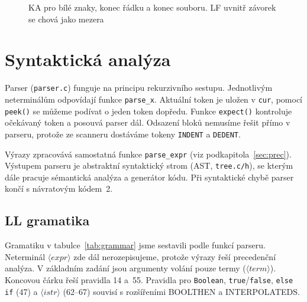 \documentclass[a4paper,11pt]{article}
\newcommand{\id}[1]{\texttt{#1}}
\newcommand{\nt}[1]{\ensuremath{\langle\mathit{#1}\rangle}}
\newcommand{\term}[1]{\texttt{#1}}
\begin{document}
\begin{figure}[H]
  \centering
  \caption{KA pro bílé znaky, konec řádku a konec souboru. LF uvnitř závorek se chová jako mezera}
  \label{fig:ka-ws}
\end{figure}


\section{Syntaktická analýza}
Parser (\id{parser.c}) funguje na principu rekurzivního sestupu. Jednotlivým neterminálům odpovídají funkce \id{parse\_x}. Aktuální token je uložen v \id{cur}, pomocí \id{peek()} se můžeme podívat o jeden token dopředu. Funkce \id{expect()} kontroluje očekávaný token a posouvá parser dál. Odsazení bloků nemusíme řešit přímo v parseru, protože ze scanneru dostáváme tokeny \term{INDENT} a \term{DEDENT}.

Výrazy zpracovává samostatná funkce \id{parse\_expr} (viz podkapitola~\ref{sec:prec}). Výstupem parseru je abstraktní syntaktický strom (AST, \id{tree.c/h}), se kterým dále pracuje sémantická analýza a generátor kódu. Při syntaktické chybě parser končí s návratovým kódem~2.

\subsection{LL gramatika}
Gramatiku v tabulce~\ref{tab:grammar} jsme sestavili podle funkcí parseru. Neterminál \nt{expr} zde dál nerozepisujeme, protože výrazy řeší precedenční analýza. V základním zadání jsou argumenty volání pouze termy (\nt{term}). Koncovou čárku řeší pravidla 14 a~55. Pravidla pro \term{Boolean}, \term{true}/\term{false}, \term{else if} (47) a \nt{istr} (62--67) souvisí s rozšířeními BOOLTHEN a INTERPOLATEDS.
\end{document}
